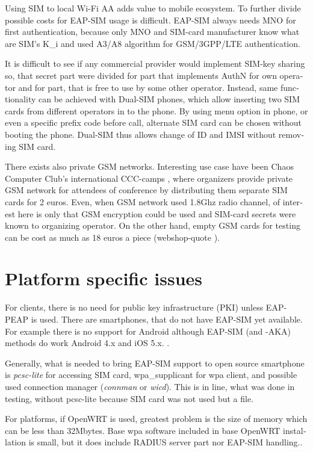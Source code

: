\documentclass[12pt,a4paper,english]{tutthesis}
\begin{document}
\begin{otherlanguage}{english}
Using SIM to local Wi-Fi AA adds value to mobile ecosystem.
To further divide possible costs for EAP-SIM usage
is difficult.
EAP-SIM always needs MNO for first authentication,
because only MNO and SIM-card manufacturer know 
what are SIM's K\_i and used A3/A8 algorithm
for GSM/3GPP/LTE authentication.

It is difficult to see if any commercial provider would implement
SIM-key sharing so, that secret part were divided for part that
implements AuthN for own operator and for part, that is free to use by
some other operator.  Instead, same functionality can be achieved with
Dual-SIM phones, which allow inserting two SIM cards from different
operators in to the phone. By using menu option in phone, or even a
specific prefix code before call, alternate SIM card can be chosen
without booting the phone.
Dual-SIM thus allows change of ID and IMSI without removing SIM card.

There exists also private GSM networks.
Interesting use case have been Chaos Computer Club's international 
CCC-camps \cite{ccc}, where organizers 
provide private GSM network for attendees of conference
by distributing them separate SIM cards for 2 euros.
Even, when GSM network used 1.8Ghz radio channel, of interest here is
only that GSM encryption could be used and SIM-card secrets were known to
organizing operator.
On the other hand, empty GSM cards for testing can be cost as much as 
18 euros a piece (webshop-quote \cite{smartjac-testsim}).


\section{Platform specific issues}
\label{sec-6-4}

For clients, there is no need for public key infrastructure (PKI) 
unless EAP-PEAP is used.
There are smartphones, that do not have EAP-SIM yet available.
For example there is no support for Android although 
EAP-SIM (and -AKA) methods do work Android 4.x and  iOS 5.x. \cite{sim-support}.


Generally, what is  needed to bring EAP-SIM support to open source
smartphone is \emph{pcsc-lite} for accessing SIM card, wpa\_supplicant for
wpa client, and possible used connection manager (\emph{connman} or
\emph{wicd}). This is in line, what was done in testing, without pcsc-lite
because SIM card was not used but a file.





For platforms, if OpenWRT is used, greatest problem is the size of
memory which can be less than 32Mbytes.
Base  wpa software included in base OpenWRT installation is small,
but it does include RADIUS server part nor EAP-SIM handling..



\end{otherlanguage}
\end{document}
